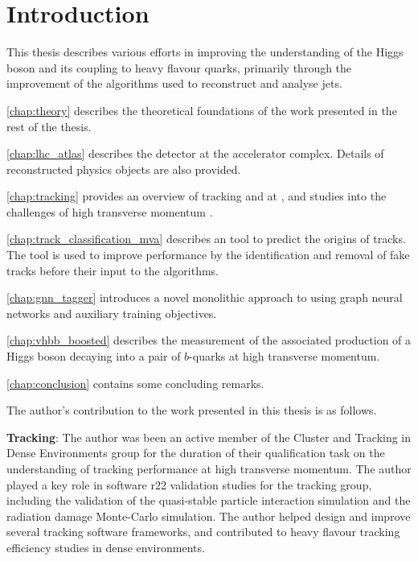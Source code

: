 \chapter{Introduction}\label{chap:intro}


This thesis describes various efforts in improving the understanding of the Higgs boson and its coupling to heavy flavour quarks, primarily through the improvement of the algorithms used to reconstruct and analyse jets.

\cref{chap:theory} describes the theoretical foundations of the work presented in the rest of the thesis.

\cref{chap:lhc_atlas} describes the \ATLAS detector at the \CERN accelerator complex. Details of reconstructed physics objects are also provided.

\cref{chap:tracking} provides an overview of tracking and \btagging at \ATLAS, and studies into the challenges of high transverse momentum \btagging.

\cref{chap:track_classification_mva} describes an tool to predict the origins of tracks. The tool is used to improve \btagging performance by the identification and removal of fake tracks before their input to the \btagging algorithms.

\cref{chap:gnn_tagger} introduces a novel monolithic approach to \btagging using graph neural networks and auxiliary training objectives.

\cref{chap:vhbb_boosted} describes the measurement of the associated production of a Higgs boson decaying into a pair of $b$-quarks at high transverse momentum.

\cref{chap:conclusion} contains some concluding remarks.


\clearpage

The author's contribution to the work presented in this thesis is as follows.

\textbf{Tracking}:
The author was been an active member of the Cluster and Tracking in Dense Environments group for the duration of their qualification task on the understanding of tracking performance at high transverse momentum.
The author played a key role in software r22 validation studies for the tracking group, including the validation of the quasi-stable particle interaction simulation and the radiation damage Monte-Carlo simulation. 
The author helped design and improve several tracking software frameworks, and contributed to heavy flavour tracking efficiency studies in dense environments.

